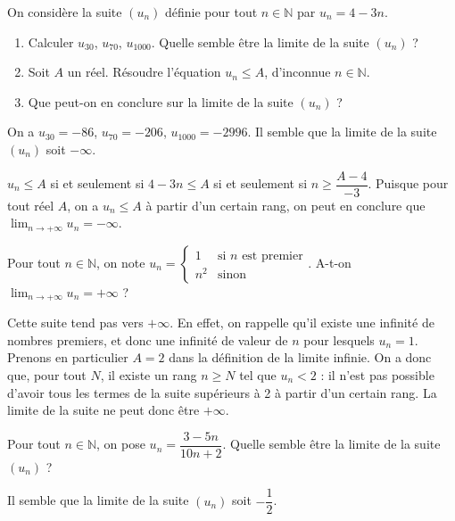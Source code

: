 \documentclass[11pt,fleqn]{book} %
\begin{document}
\begin{exercise}On considère la suite $(u_n)$ définie pour tout $n\in \mathbb{N}$ par  $u_n=4-3n$.
\begin{enumerate}
\item Calculer $u_{30}$, $u_{70}$, $u_{1000}$. Quelle semble être la limite de la suite $(u_n)$ ?
\item Soit $A$ un réel. Résoudre l'équation $u_n \leqslant A$, d'inconnue $n\in\mathbb{N}$.
\item Que peut-on en conclure sur la limite de la suite $(u_n)$ ?
\end{enumerate}
\end{exercise}
\begin{solution}On a $u_{30}=-86$, $u_{70}=-206$, $u_{1000}=-2996$. Il semble que la limite de la suite $(u_n)$ soit $-\infty$.

$u_n\leqslant A$ si et seulement si $4-3n \leqslant A$ si et seulement si $n\geqslant \dfrac{A-4}{-3}$. Puisque pour tout réel $A$, on a $u_n \leqslant A$ à partir d'un certain rang, on peut en conclure que $\displaystyle \lim _{n\to +\infty} u_n = -\infty$.\end{solution}




\begin{exercise}Pour tout $n\in\mathbb{N}$, on note $u_n=\left\{\begin{array}{ll} 1 & \text{si } n \text{ est premier}\\
n^2 & \text{sinon}

\end{array}\right.$. A-t-on $\displaystyle \lim _{n\to +\infty} u_n = +\infty$ ?\end{exercise}
\begin{solution}Cette suite tend pas vers $+\infty$. En effet, on rappelle qu'il existe une infinité de nombres premiers, et donc une infinité de valeur de $n$ pour lesquels $u_n = 1$. Prenons en particulier $A=2$ dans la définition de la limite infinie. On a donc que, pour tout $N$, il existe un rang $n \geqslant N$ tel que $u_n < 2$ : il n'est pas possible d'avoir tous les termes de la suite supérieurs à 2 à partir d'un certain rang. La limite de la suite ne peut donc être $+\infty$. \end{solution}




\begin{exercise}Pour tout $n\in\mathbb{N}$, on pose $u_n=\dfrac{3-5n}{10n+2}$. Quelle semble être la limite de la suite $(u_n)$ ?\end{exercise}
\begin{solution}Il semble que la limite de la suite $(u_n)$ soit $-\dfrac{1}{2}$.\end{solution}
\end{document}
